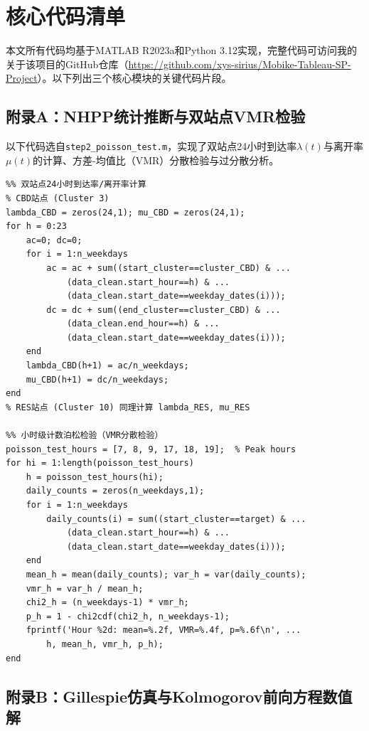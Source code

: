 \documentclass[12pt,a4paper]{article}
\begin{document}
\appendix
\section{核心代码清单}

本文所有代码均基于MATLAB R2023a和Python 3.12实现，完整代码可访问我的关于该项目的GitHub仓库（\url{https://github.com/xys-sirius/Mobike-Tableau-SP-Project}）。以下列出三个核心模块的关键代码片段。

\subsection{附录A：NHPP统计推断与双站点VMR检验}

以下代码选自\texttt{step2\_poisson\_test.m}，实现了双站点24小时到达率$\lambda(t)$与离开率$\mu(t)$的计算、方差-均值比（VMR）分散检验与过分散分析。

\begin{verbatim}
%% 双站点24小时到达率/离开率计算
% CBD站点 (Cluster 3)
lambda_CBD = zeros(24,1); mu_CBD = zeros(24,1);
for h = 0:23
    ac=0; dc=0;
    for i = 1:n_weekdays
        ac = ac + sum((start_cluster==cluster_CBD) & ...
            (data_clean.start_hour==h) & ...
            (data_clean.start_date==weekday_dates(i)));
        dc = dc + sum((end_cluster==cluster_CBD) & ...
            (data_clean.end_hour==h) & ...
            (data_clean.start_date==weekday_dates(i)));
    end
    lambda_CBD(h+1) = ac/n_weekdays;
    mu_CBD(h+1) = dc/n_weekdays;
end
% RES站点 (Cluster 10) 同理计算 lambda_RES, mu_RES

%% 小时级计数泊松检验（VMR分散检验）
poisson_test_hours = [7, 8, 9, 17, 18, 19];  % Peak hours
for hi = 1:length(poisson_test_hours)
    h = poisson_test_hours(hi);
    daily_counts = zeros(n_weekdays,1);
    for i = 1:n_weekdays
        daily_counts(i) = sum((start_cluster==target) & ...
            (data_clean.start_hour==h) & ...
            (data_clean.start_date==weekday_dates(i)));
    end
    mean_h = mean(daily_counts); var_h = var(daily_counts);
    vmr_h = var_h / mean_h;
    chi2_h = (n_weekdays-1) * vmr_h;
    p_h = 1 - chi2cdf(chi2_h, n_weekdays-1);
    fprintf('Hour %2d: mean=%.2f, VMR=%.4f, p=%.6f\n', ...
        h, mean_h, vmr_h, p_h);
end
\end{verbatim}

\subsection{附录B：Gillespie仿真与Kolmogorov前向方程数值解}
\end{document}
